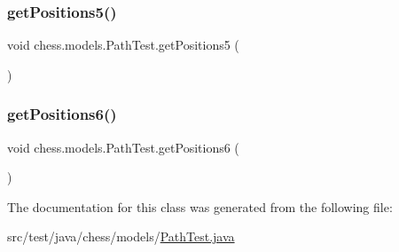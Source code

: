 \mbox{\label{classchess_1_1models_1_1_path_test_aa34d58c5b3a3227dc5149a288c804703}} 
\subsubsection{\texorpdfstring{get\+Positions5()}{getPositions5()}}
{\footnotesize\ttfamily void chess.\+models.\+Path\+Test.\+get\+Positions5 (\begin{DoxyParamCaption}{ }\end{DoxyParamCaption})}

\mbox{\label{classchess_1_1models_1_1_path_test_a3dd398e0f0b6122db0ab49e67e1182b0}} 
\subsubsection{\texorpdfstring{get\+Positions6()}{getPositions6()}}
{\footnotesize\ttfamily void chess.\+models.\+Path\+Test.\+get\+Positions6 (\begin{DoxyParamCaption}{ }\end{DoxyParamCaption})}



The documentation for this class was generated from the following file\+:\begin{DoxyCompactItemize}
\item 
src/test/java/chess/models/\mbox{\hyperlink{_path_test_8java}{Path\+Test.\+java}}\end{DoxyCompactItemize}
